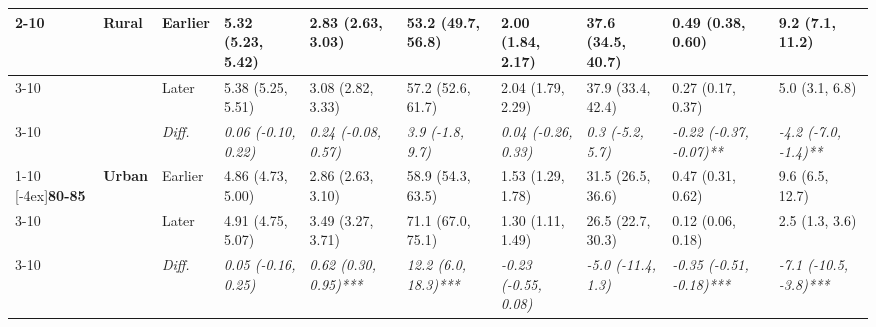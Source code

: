 \documentclass[12pt, a4paper]{article}
\begin{document}
\begin{appendices}
\begin{table}[!p]
{\begin{tabular}[t]{>{}l>{}lllllllll}
        \cmidrule{2-10}
                                              & \multirow{3}{*}{\textbf{Rural}} & Earlier                       & 5.32 (5.23, 5.42)                           & 2.83 (2.63, 3.03)                            & 53.2 (49.7, 56.8)                           & 2.00 (1.84, 2.17)                             & 37.6 (34.5, 40.7)                             & 0.49 (0.38, 0.60)                               & 9.2 (7.1, 11.2)                               \\
        \cmidrule{3-10}
                                              &                                 & Later                         & 5.38 (5.25, 5.51)                           & 3.08 (2.82, 3.33)                            & 57.2 (52.6, 61.7)                           & 2.04 (1.79, 2.29)                             & 37.9 (33.4, 42.4)                             & 0.27 (0.17, 0.37)                               & 5.0 (3.1, 6.8)                                \\
        \cmidrule{3-10}
                                              &                                 & \cellcolor{gray!10}\em{Diff.} & \cellcolor{gray!10}\em{0.06 (-0.10, 0.22)}  & \cellcolor{gray!10}\em{0.24 (-0.08, 0.57)}   & \cellcolor{gray!10}\em{3.9 (-1.8, 9.7)}     & \cellcolor{gray!10}\em{0.04 (-0.26, 0.33)}    & \cellcolor{gray!10}\em{0.3 (-5.2, 5.7)}       & \cellcolor{gray!10}\em{-0.22 (-0.37, -0.07)**}  & \cellcolor{gray!10}\em{-4.2 (-7.0, -1.4)**}   \\
        \cmidrule{1-10}
        \multirow{9}{*}[-4ex]{\textbf{80-85}} & \multirow{3}{*}{\textbf{Urban}} & Earlier                       & 4.86 (4.73, 5.00)                           & 2.86 (2.63, 3.10)                            & 58.9 (54.3, 63.5)                           & 1.53 (1.29, 1.78)                             & 31.5 (26.5, 36.6)                             & 0.47 (0.31, 0.62)                               & 9.6 (6.5, 12.7)                               \\
        \cmidrule{3-10}
                                              &                                 & Later                         & 4.91 (4.75, 5.07)                           & 3.49 (3.27, 3.71)                            & 71.1 (67.0, 75.1)                           & 1.30 (1.11, 1.49)                             & 26.5 (22.7, 30.3)                             & 0.12 (0.06, 0.18)                               & 2.5 (1.3, 3.6)                                \\
        \cmidrule{3-10}
                                              &                                 & \cellcolor{gray!10}\em{Diff.} & \cellcolor{gray!10}\em{0.05 (-0.16, 0.25)}  & \cellcolor{gray!10}\em{0.62 (0.30, 0.95)***} & \cellcolor{gray!10}\em{12.2 (6.0, 18.3)***} & \cellcolor{gray!10}\em{-0.23 (-0.55, 0.08)}   & \cellcolor{gray!10}\em{-5.0 (-11.4, 1.3)}     & \cellcolor{gray!10}\em{-0.35 (-0.51, -0.18)***} & \cellcolor{gray!10}\em{-7.1 (-10.5, -3.8)***} \\

\end{tabular}}
\end{table}
\end{appendices}
\end{document}
